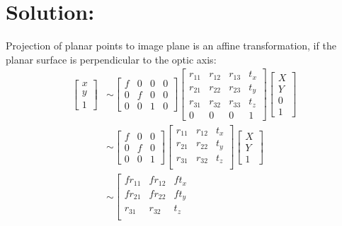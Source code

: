 \documentclass[12pt]{article}
\begin{document}
\section{Solution:}
Projection of planar points to image plane is an affine transformation, if the planar surface is perpendicular to the optic axis:
\begin{equation*}
\begin{aligned}
\left[ \begin{array}{c}
x\\
y\\
1
\end{array} \right] &\sim \left[ \begin{array}{cccc}
f & 0 & 0 & 0\\
0 & f & 0 & 0\\
0 & 0 & 1 & 0
\end{array} \right]\left[ \begin{array}{cccc}
r_{11} & r_{12} & r_{13} & t_x \\
r_{21} & r_{22} & r_{23} & t_y\\
r_{31} & r_{32} & r_{33} & t_z\\
0 & 0 & 0 & 1
\end{array} \right]\left[ \begin{array}{c}
X\\
Y\\
0\\
1
\end{array} \right] \\
&\sim \left[ \begin{array}{cccc}
f & 0 & 0\\
0 & f & 0\\
0 & 0 & 1
\end{array} \right]\left[ \begin{array}{cccc}
r_{11} & r_{12} & t_x \\
r_{21} & r_{22} & t_y\\
r_{31} & r_{32} & t_z\\
\end{array} \right]\left[ \begin{array}{c}
X\\
Y\\
1
\end{array} \right] \\
&\sim \left[ \begin{array}{cccc}
fr_{11} & fr_{12} & ft_x \\
fr_{21} & fr_{22} & ft_y\\
r_{31} & r_{32} & t_z\\

\end{array}
\end{aligned}
\end{equation*}
\end{document}

